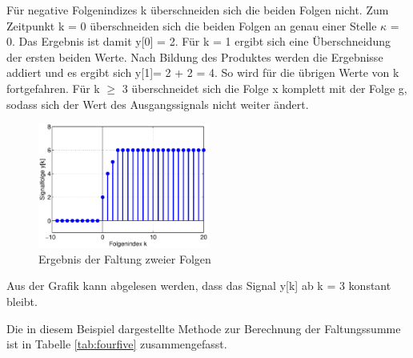 \noindent F\"{u}r negative Folgenindizes k \"{u}berschneiden sich die beiden Folgen nicht. Zum Zeitpunkt k = 0 \"{u}berschneiden sich die beiden Folgen an genau einer Stelle $\kappa$ = 0. Das Ergebnis ist damit y[0] = 2. F\"{u}r k = 1 ergibt sich eine \"{U}berschneidung der ersten beiden Werte. Nach Bildung des Produktes werden die Ergebnisse addiert und es ergibt sich y[1]= 2 + 2 = 4. So wird f\"{u}r die \"{u}brigen Werte von k fortgefahren. F\"{u}r k $\geq$ 3 \"{u}berschneidet sich die Folge x komplett mit der Folge g, sodass sich der Wert des Ausgangssignals nicht weiter \"{a}ndert. 

\begin{figure}[H]
  \centerline{\includegraphics[width=0.5\textwidth]{Kapitel4/Bilder/image16.eps}}
  \caption{Ergebnis der Faltung zweier Folgen}
  \label{fig:GrafischeFaltung2}
\end{figure}

\noindent Aus der Grafik kann abgelesen werden, dass das Signal y[k] ab k = 3 konstant bleibt.

\clearpage

\noindent Die in diesem Beispiel dargestellte Methode zur Berechnung der Faltungssumme ist in Tabelle \ref{tab:fourfive} zusammengefasst.

